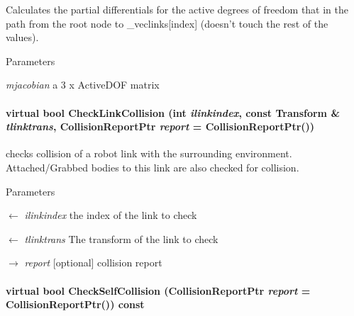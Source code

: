 Calculates the partial differentials for the active degrees of freedom that in the path from the root node to \_\-veclinks\mbox{[}index\mbox{]} (doesn't touch the rest of the values). 
\begin{DoxyParams}{Parameters}
\item[{\em mjacobian}]a 3 x ActiveDOF matrix \end{DoxyParams}
\hypertarget{classOpenRAVE_1_1RobotBase_ac0f7aeb30af9069736ec789db0bf75d8}{
\paragraph[{CheckLinkCollision}]{\setlength{\rightskip}{0pt plus 5cm}virtual bool CheckLinkCollision (int {\em ilinkindex}, \/  const Transform \& {\em tlinktrans}, \/  CollisionReportPtr {\em report} = {\ttfamily CollisionReportPtr()})}\hfill}
\label{classOpenRAVE_1_1RobotBase_ac0f7aeb30af9069736ec789db0bf75d8}


checks collision of a robot link with the surrounding environment. Attached/Grabbed bodies to this link are also checked for collision. 


\begin{DoxyParams}{Parameters}
\item[\mbox{$\leftarrow$} {\em ilinkindex}]the index of the link to check \item[\mbox{$\leftarrow$} {\em tlinktrans}]The transform of the link to check \item[\mbox{$\rightarrow$} {\em report}]\mbox{[}optional\mbox{]} collision report \end{DoxyParams}
\hypertarget{classOpenRAVE_1_1RobotBase_a3d555222cf7b02d592a0a31cef5d479d}{
\paragraph[{CheckSelfCollision}]{\setlength{\rightskip}{0pt plus 5cm}virtual bool CheckSelfCollision (CollisionReportPtr {\em report} = {\ttfamily CollisionReportPtr()}) const}\hfill}
\label{classOpenRAVE_1_1RobotBase_a3d555222cf7b02d592a0a31cef5d479d}


